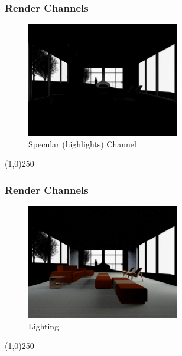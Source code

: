 \begin{frame}
\frametitle{Render Channels}
\begin{figure}
	\centering
	\includegraphics[height=5cm]{./img/Rendering/SittingRoomFinalSpecular.png}
	\caption[Specular (highlights) Channel]{Specular (highlights) Channel}
	\label{fig:sittingroomfinalSpecular}
\end{figure}
\end{frame}
\begin{center}\line(1,0){250}\end{center}

\begin{frame}
\frametitle{Render Channels}
\begin{figure}
	\centering
	\includegraphics[height=5cm]{./img/Rendering/SittingRoomFinalLighting}
	\caption[Lighting]{Lighting}
	\label{fig:sittingroomfinalLighting}
\end{figure}
\end{frame}
\begin{center}\line(1,0){250}\end{center}






